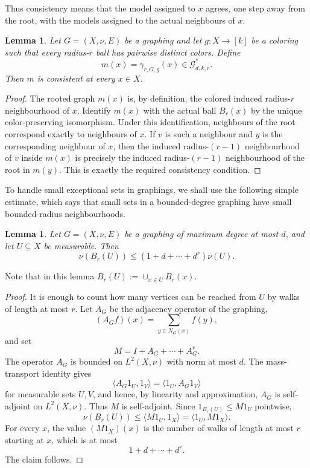 \documentclass[11pt]{amsart}
\newcommand{\calG}{\mathcal G}
\newtheorem{lemma}[theorem]{Lemma}
\theoremstyle{remark}
\begin{document}
Thus consistency means that the model assigned to $x$ agrees, one step away from the root, with the models assigned to the actual neighbours of $x$.

\begin{lemma}\label{lem:true-neighbourhoods-consistent}
Let $G=(X,\nu,E)$ be a graphing and let $g\colon X\to[k]$ be a coloring such that every radius-$r$ ball has pairwise distinct colors.  Define
\[
 m(x)=\gamma_{r,G,g}(x)\in\calG^*_{d,k,r}.
\]
Then $m$ is consistent at every $x\in X$.
\end{lemma}

\begin{proof}
The rooted graph $m(x)$ is, by definition, the colored induced radius-$r$ neighbourhood of $x$.  Identify $m(x)$ with the actual ball $B_r(x)$ by the unique color-preserving isomorphism.  Under this identification, neighbours of the root correspond exactly to neighbours of $x$.  If $v$ is such a neighbour and $y$ is the corresponding neighbour of $x$, then the induced radius-$(r-1)$ neighbourhood of $v$ inside $m(x)$ is precisely the induced radius-$(r-1)$ neighbourhood of the root in $m(y)$.  This is exactly the required consistency condition.
\end{proof}

To handle small exceptional sets in graphings, we shall use the following simple estimate, which says that small sets in a bounded-degree graphing have small bounded-radius neighbourhoods. 

\begin{lemma}\label{lem:neighbourhood-measure}
Let $G=(X,\nu,E)$ be a graphing of maximum degree at most $d$, and let $U\subseteq X$ be measurable.  Then
\[
 \nu(B_r(U))\leq (1+d+\cdots+d^r)\nu(U).
\]
\end{lemma}

Note that in this lemma $B_r(U):=\cup_{x\in U}B_r(x)$.

\begin{proof}
It is enough to count how many vertices can be reached from $U$ by walks of length at most $r$.  Let $A_G$ be the adjacency operator of the graphing,
\[
 (A_Gf)(x)=\sum_{y\in N_G(x)} f(y),
\]
and set
\[
 M=I+A_G+\cdots+A_G^r.
\]
The operator $A_G$ is bounded on $L^2(X,\nu)$ with norm at most $d$.  The mass-transport identity gives
\[
 \langle A_G1_U,1_V\rangle=\langle 1_U,A_G1_V\rangle
\]
for measurable sets $U,V$, and hence, by linearity and approximation, $A_G$ is self-adjoint on $L^2(X,\nu)$.  Thus $M$ is self-adjoint.  Since $1_{B_r(U)}\leq M1_U$ pointwise,
\[
 \nu(B_r(U))\leq \langle M1_U,1_X\rangle
 =\langle 1_U,M1_X\rangle.
\]
For every $x$, the value $(M1_X)(x)$ is the number of walks of length at most $r$ starting at $x$, which is at most
\[
 1+d+\cdots+d^r.
\]
The claim follows.
\end{proof}
\end{document}

